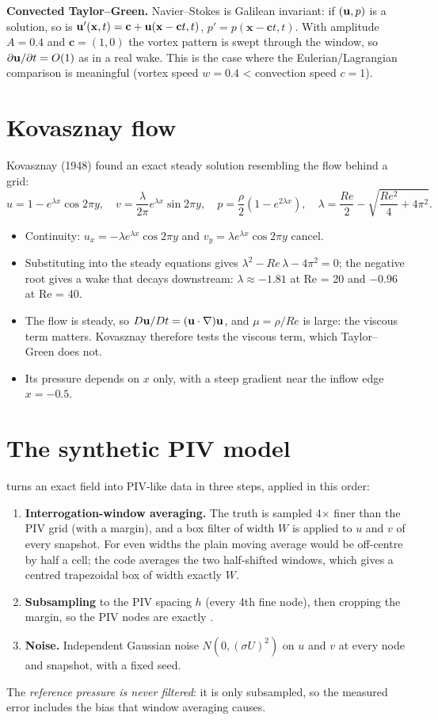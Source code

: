 \textbf{Convected Taylor--Green.} Navier--Stokes is Galilean invariant: if $(\mathbf{u},p)$ is a solution, so is $\mathbf{u}'(\mathbf x,t)=\mathbf c+\mathbf{u}(\mathbf x-\mathbf ct,t)$, $p'=p(\mathbf x-\mathbf ct,t)$. With amplitude $A=0.4$ and $\mathbf c=(1,0)$ the vortex pattern is swept through the window, so $\partial\mathbf{u}/\partial t=O(1)$ as in a real wake. This is the case where the Eulerian/Lagrangian comparison is meaningful (vortex speed $w=0.4$ < convection speed $c=1$).

\section{Kovasznay flow}
Kovasznay (1948) found an exact steady solution resembling the flow behind a grid:
\begin{equation}
u=1-e^{\lambda x}\cos2\pi y,\quad v=\frac{\lambda}{2\pi}e^{\lambda x}\sin2\pi y,\quad p=\frac{\rho}{2}\left(1-e^{2\lambda x}\right),\quad \lambda=\frac{Re}{2}-\sqrt{\frac{Re^2}{4}+4\pi^2}.
\end{equation}
\begin{itemize}
\item Continuity: $u_x=-\lambda e^{\lambda x}\cos2\pi y$ and $v_y=\lambda e^{\lambda x}\cos2\pi y$ cancel. \checkmark
\item Substituting into the steady equations gives $\lambda^2-Re\,\lambda-4\pi^2=0$; the negative root gives a wake that decays downstream: $\lambda\approx-1.81$ at Re = 20 and $-0.96$ at Re = 40.
\item The flow is steady, so $D\mathbf{u}/Dt=(\mathbf{u}\cdot\nabla)\mathbf{u}$, and $\mu=\rho/Re$ is large: the viscous term matters. Kovasznay therefore tests the viscous term, which Taylor--Green does not.
\item Its pressure depends on $x$ only, with a steep gradient near the inflow edge $x=-0.5$.
\end{itemize}

\section{The synthetic PIV model}
 turns an exact field into PIV-like data in three steps, applied in this order:
\begin{enumerate}
\item \textbf{Interrogation-window averaging.} The truth is sampled 4$\times$ finer than the PIV grid (with a margin), and a box filter of width $W$ is applied to $u$ and $v$ of every snapshot. For even widths the plain moving average would be off-centre by half a cell; the code averages the two half-shifted windows, which gives a centred trapezoidal box of width exactly $W$.
\item \textbf{Subsampling} to the PIV spacing $h$ (every 4th fine node), then cropping the margin, so the PIV nodes are exactly .
\item \textbf{Noise.} Independent Gaussian noise $N(0,(\sigma U)^2)$ on $u$ and $v$ at every node and snapshot, with a fixed seed.
\end{enumerate}
The \emph{reference pressure is never filtered}: it is only subsampled, so the measured error includes the bias that window averaging causes.

